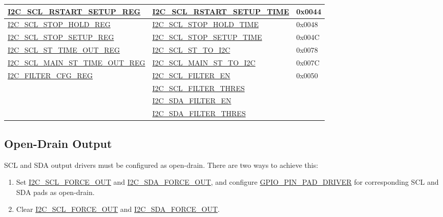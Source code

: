 \documentclass[main\_\_EN.tex]{subfiles}
\begin{document}
\begin{longtable}{ | p{6cm} | p{7cm} | p{2cm} | }
\hyperref[regdesc:I2CSCLRSTARTSETUPREG]{I2C\_SCL\_RSTART\_SETUP\_REG} & \hyperref[fielddesc:I2CSCLRSTARTSETUPTIME]{I2C\_SCL\_RSTART\_SETUP\_TIME} & 0x0044  \\ \hline
\hyperref[regdesc:I2CSCLSTOPHOLDREG]{I2C\_SCL\_STOP\_HOLD\_REG} & \hyperref[fielddesc:I2CSCLSTOPHOLDTIME]{I2C\_SCL\_STOP\_HOLD\_TIME} & 0x0048  \\ \hline
\hyperref[regdesc:I2CSCLSTOPSETUPREG]{I2C\_SCL\_STOP\_SETUP\_REG} & \hyperref[fielddesc:I2CSCLSTOPSETUPTIME]{I2C\_SCL\_STOP\_SETUP\_TIME} & 0x004C  \\ \hline
\hyperref[regdesc:I2CSCLSTTIMEOUTREG]{I2C\_SCL\_ST\_TIME\_OUT\_REG}& \hyperref[fielddesc:I2CSCLSTTOI2C]{I2C\_SCL\_ST\_TO\_I2C} & 0x0078\\ \hline
\hyperref[regdesc:I2CSCLMAINSTTIMEOUTREG]{I2C\_SCL\_MAIN\_ST\_TIME\_OUT\_REG}& \hyperref[fielddesc:I2CSCLMAINSTTOI2C]{I2C\_SCL\_MAIN\_ST\_TO\_I2C} & 0x007C\\ \hline
\hyperref[regdesc:I2CFILTERCFGREG]{I2C\_FILTER\_CFG\_REG} & {\hyperref[fielddesc:I2CSCLFILTEREN]{I2C\_SCL\_FILTER\_EN}} & 0x0050  \\\cline{2-2}
& {\hyperref[fielddesc:I2CSCLFILTERTHRES]{I2C\_SCL\_FILTER\_THRES}}& \\\cline{2-2}
& {\hyperref[fielddesc:I2CSDAFILTEREN]{I2C\_SDA\_FILTER\_EN}} &  \\\cline{2-2}
& {\hyperref[fielddesc:I2CSDAFILTERTHRES]{I2C\_SDA\_FILTER\_THRES}} & \\ \hline
\end{longtable}

\subsection{Open-Drain Output}

SCL and SDA output drivers must be configured as open-drain. There are two ways to achieve this:

\begin{enumerate}
\item Set \hyperref[fielddesc:I2CSCLFORCEOUT]{I2C\_SCL\_FORCE\_OUT} and \hyperref[fielddesc:I2CSDAFORCEOUT]{I2C\_SDA\_FORCE\_OUT}, and configure \hyperref[fielddesc:GPIOPINNPADDRIVER]{GPIO\_PIN\_PAD\_DRIVER} for corresponding SCL and SDA pads as open-drain.
\item Clear \hyperref[fielddesc:I2CSCLFORCEOUT]{I2C\_SCL\_FORCE\_OUT} and \hyperref[fielddesc:I2CSDAFORCEOUT]{I2C\_SDA\_FORCE\_OUT}.
\end{enumerate}
\end{document}
